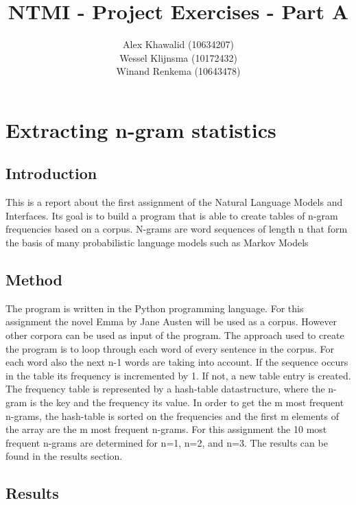 \documentclass[a4paper, 10pt]{article}
\title{NTMI - Project Exercises - Part A}
\author{Alex Khawalid (10634207)\\
Wessel Klijnsma (10172432)\\
Winand Renkema (10643478)\\
}
\begin{document}
\maketitle

\section{Extracting n-gram statistics}

\subsection{Introduction}
This is a report about the first assignment of the Natural Language Models and Interfaces. Its goal is to build a program that is able to create tables of n-gram frequencies based on a corpus. N-grams are word sequences of length n that form the basis of many probabilistic language models such as Markov Models

\subsection{Method}
The program is written in the Python programming language. For this assignment the novel Emma by Jane Austen will be used as a corpus. However other corpora can be used as input of the program.
The approach used to create the program is to loop through each word of every sentence in the corpus. For each word also the next n-1 words are taking into account. If the sequence occurs in the table its frequency is incremented by 1. If not, a new table entry is created.
The frequency table is represented by a hash-table datastructure, where the n-gram is the key and the frequency its value.
In order to get the m most frequent n-grams, the hash-table is sorted on the frequencies and the first m elements of the array are the m most frequent n-grams. For this assignment the 10 most frequent n-grams are determined for n=1, n=2, and n=3. The results can be found in the results section.

\subsection{Results}
\end{document}
